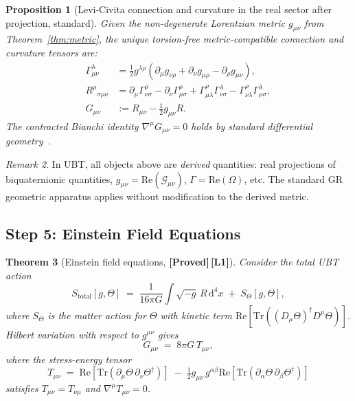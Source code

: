 \documentclass[12pt,a4paper]{article}
\newtheorem{theorem}{Theorem}[section]
\newtheorem{proposition}[theorem]{Proposition}
\theoremstyle{definition}
\theoremstyle{remark}
\newtheorem{remark}[theorem]{Remark}
\newcommand{\PROVED}{\textbf{[Proved]}}
\newcommand{\Lone}{\textbf{[L1]}}
\newcommand{\Tr}{\mathrm{Tr}}
\newcommand{\re}{\mathrm{Re}}
\newcommand{\calG}{\mathcal{G}}
\begin{document}
\begin{proposition}[Levi-Civita connection and curvature in the real sector after projection, standard]
\label{prop:geometry}
Given the non-degenerate Lorentzian metric $g_{\mu\nu}$ from
Theorem~\ref{thm:metric}, the unique torsion-free metric-compatible connection
and curvature tensors are:
\begin{align}
  \Gamma^\lambda_{\mu\nu}
    &= \tfrac{1}{2}g^{\lambda\rho}
       (\partial_\mu g_{\nu\rho} + \partial_\nu g_{\mu\rho}
        - \partial_\rho g_{\mu\nu}), \\
  R^\rho{}_{\sigma\mu\nu}
    &= \partial_\mu\Gamma^\rho_{\nu\sigma}
       - \partial_\nu\Gamma^\rho_{\mu\sigma}
       + \Gamma^\rho_{\mu\lambda}\Gamma^\lambda_{\nu\sigma}
       - \Gamma^\rho_{\nu\lambda}\Gamma^\lambda_{\mu\sigma}, \\
  G_{\mu\nu}
    &:= R_{\mu\nu} - \tfrac{1}{2}g_{\mu\nu}R.
\end{align}
The contracted Bianchi identity $\nabla^\mu G_{\mu\nu} = 0$ holds by standard
differential geometry~\cite{wald1984,mtw1973}.
\end{proposition}

\begin{remark}
In UBT, all objects above are \emph{derived} quantities: real projections of
biquaternionic quantities,
$g_{\mu\nu} = \re(\calG_{\mu\nu})$,
$\Gamma = \re(\Omega)$, etc.
The standard GR geometric apparatus applies without modification to the
derived metric.
\end{remark}

\subsection{Step 5: Einstein Field Equations}
\label{sec:step5}

\begin{theorem}[Einstein field equations, \PROVED\,\Lone]
\label{thm:einstein}
Consider the total UBT action
\[
  S_{\mathrm{total}}[g,\Theta]
  \;=\; \frac{1}{16\pi G}\int\!\!\sqrt{-g}\,R\,\mathrm{d}^4x
  \;+\; S_\Theta[g,\Theta],
\]
where $S_\Theta$ is the matter action for $\Theta$ with kinetic term
$\re[\Tr((D_\mu\Theta)^\dagger D^\mu\Theta)]$.
Hilbert variation with respect to $g^{\mu\nu}$ gives
\[
  G_{\mu\nu} \;=\; 8\pi G\,T_{\mu\nu},
\]
where the stress-energy tensor
\[
  T_{\mu\nu}
  \;=\; \re[\Tr(\partial_\mu\Theta\,\partial_\nu\Theta^\dagger)]
  \;-\; \tfrac{1}{2}g_{\mu\nu}\,g^{\alpha\beta}
        \re[\Tr(\partial_\alpha\Theta\,\partial_\beta\Theta^\dagger)]
\]
satisfies $T_{\mu\nu} = T_{\nu\mu}$ and $\nabla^\mu T_{\mu\nu} = 0$.
\end{theorem}
\end{document}
